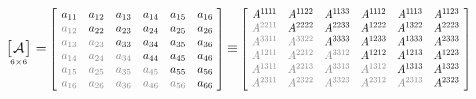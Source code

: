 \begin{gather}\label{stiffnessasmatrix}
\displaystyle
\asmatrixwithdimensions{\mathcal{A}}{6}{6}
\hspace{.1ex} = \hspace{-0.2ex}
\scalebox{.82}{$ \left[ \hspace{.4em}
   \begin{matrix}
      a_{11} & a_{12} & a_{13} & a_{14} & a_{15} & a_{16} \\
      \mathgray{a_{12}} & a_{22} & a_{23} & a_{24} & a_{25} & a_{26} \\
      \mathgray{a_{13}} & \mathgray{a_{23}} & a_{33} & a_{34} & a_{35} & a_{36} \\
      \mathgray{a_{14}} & \mathgray{a_{24}} & \mathgray{a_{34}} & a_{44} & a_{45} & a_{46} \\
      \mathgray{a_{15}} & \mathgray{a_{25}} & \mathgray{a_{35}} & \mathgray{a_{45}} & a_{55} & a_{56} \\
      \mathgray{a_{16}} & \mathgray{a_{26}} & \mathgray{a_{36}} & \mathgray{a_{46}} & \mathgray{a_{56}} & a_{66}
   \end{matrix}
\hspace{.32em} \right] $}
%
\hspace{-0.2ex} \equiv \hspace{-0.2ex}
%
\scalebox{.77}[.82]{$ \left[ \hspace{.4em}
   \begin{matrix}
     A^{\oneone\hspace{-0.1ex}\oneone} &
     A^{\oneone 22} &
     A^{\oneone 33} &
     A^{\oneone\hspace{-0.1ex}12} &
     A^{\oneone\hspace{-0.1ex}13} &
     A^{\oneone 23}
     \\
     \mathgray{A^{22\oneone}} &
     A^{2222} &
     A^{2233} &
     A^{1222} &
     A^{1322} &
     A^{2223}
     \\
     \mathgray{A^{33\oneone}} &
     \mathgray{A^{3322}} &
     A^{3333} &
     A^{1233} &
     A^{1333} &
     A^{2333}
     \\
     \mathgray{A^{12\oneone}} &
     \mathgray{A^{2212}} &
     \mathgray{A^{3312}} &
     A^{1212} &
     A^{1213} &
     A^{1223}
     \\
     \mathgray{A^{13\oneone}} &
     \mathgray{A^{2213}} &
     \mathgray{A^{3313}} &
     \mathgray{A^{1312}} &
     A^{1313} &
     A^{1323}
     \\
     \mathgray{A^{23\oneone}} &
     \mathgray{A^{2322}} &
     \mathgray{A^{3323}} &
     \mathgray{A^{2312}} &
     \mathgray{A^{2313}} &
     A^{2323}
   \end{matrix}
\hspace{.4em} \right] $}
\end{gather}

